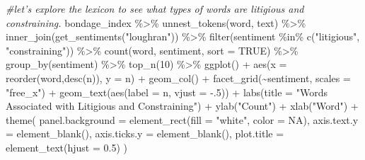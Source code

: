 \documentclass[
]{article}
\newenvironment{Shaded}{\begin{snugshade}}{\end{snugshade}}
\newcommand{\AttributeTok}[1]{\textcolor[rgb]{0.77,0.63,0.00}{#1}}
\newcommand{\CommentTok}[1]{\textcolor[rgb]{0.56,0.35,0.01}{\textit{#1}}}
\newcommand{\ConstantTok}[1]{\textcolor[rgb]{0.00,0.00,0.00}{#1}}
\newcommand{\DecValTok}[1]{\textcolor[rgb]{0.00,0.00,0.81}{#1}}
\newcommand{\FloatTok}[1]{\textcolor[rgb]{0.00,0.00,0.81}{#1}}
\newcommand{\FunctionTok}[1]{\textcolor[rgb]{0.00,0.00,0.00}{#1}}
\newcommand{\NormalTok}[1]{#1}
\newcommand{\SpecialCharTok}[1]{\textcolor[rgb]{0.00,0.00,0.00}{#1}}
\newcommand{\StringTok}[1]{\textcolor[rgb]{0.31,0.60,0.02}{#1}}
\begin{document}
\begin{Shaded}
\begin{Highlighting}[]
\CommentTok{\#let’s explore the lexicon to see what types of words are litigious and constraining.}
\NormalTok{bondage\_index }\SpecialCharTok{\%\textgreater{}\%} 
  \FunctionTok{unnest\_tokens}\NormalTok{(word, text) }\SpecialCharTok{\%\textgreater{}\%} 
  \FunctionTok{inner\_join}\NormalTok{(}\FunctionTok{get\_sentiments}\NormalTok{(}\StringTok{"loughran"}\NormalTok{)) }\SpecialCharTok{\%\textgreater{}\%}
  \FunctionTok{filter}\NormalTok{(sentiment }\SpecialCharTok{\%in\%} \FunctionTok{c}\NormalTok{(}\StringTok{"litigious"}\NormalTok{, }\StringTok{"constraining"}\NormalTok{)) }\SpecialCharTok{\%\textgreater{}\%}
  \FunctionTok{count}\NormalTok{(word, sentiment, }\AttributeTok{sort =} \ConstantTok{TRUE}\NormalTok{) }\SpecialCharTok{\%\textgreater{}\%}
  \FunctionTok{group\_by}\NormalTok{(sentiment) }\SpecialCharTok{\%\textgreater{}\%}
  \FunctionTok{top\_n}\NormalTok{(}\DecValTok{10}\NormalTok{) }\SpecialCharTok{\%\textgreater{}\%}
  \FunctionTok{ggplot}\NormalTok{() }\SpecialCharTok{+} 
  \FunctionTok{aes}\NormalTok{(}\AttributeTok{x =} \FunctionTok{reorder}\NormalTok{(word,}\FunctionTok{desc}\NormalTok{(n)), }\AttributeTok{y =}\NormalTok{ n) }\SpecialCharTok{+} 
  \FunctionTok{geom\_col}\NormalTok{() }\SpecialCharTok{+}
  \FunctionTok{facet\_grid}\NormalTok{(}\SpecialCharTok{\textasciitilde{}}\NormalTok{sentiment, }\AttributeTok{scales =} \StringTok{"free\_x"}\NormalTok{)  }\SpecialCharTok{+} 
  \FunctionTok{geom\_text}\NormalTok{(}\FunctionTok{aes}\NormalTok{(}\AttributeTok{label =}\NormalTok{ n, }\AttributeTok{vjust =} \SpecialCharTok{{-}}\NormalTok{.}\DecValTok{5}\NormalTok{)) }\SpecialCharTok{+} 
  \FunctionTok{labs}\NormalTok{(}\AttributeTok{title =} \StringTok{"Words Associated with Litigious and Constraining"}\NormalTok{) }\SpecialCharTok{+} 
  \FunctionTok{ylab}\NormalTok{(}\StringTok{"Count"}\NormalTok{) }\SpecialCharTok{+} 
  \FunctionTok{xlab}\NormalTok{(}\StringTok{"Word"}\NormalTok{) }\SpecialCharTok{+} 
  \FunctionTok{theme}\NormalTok{(}
    \AttributeTok{panel.background =} \FunctionTok{element\_rect}\NormalTok{(}\AttributeTok{fill =} \StringTok{"white"}\NormalTok{, }\AttributeTok{color =} \ConstantTok{NA}\NormalTok{),}
    \AttributeTok{axis.text.y =} \FunctionTok{element\_blank}\NormalTok{(), }
    \AttributeTok{axis.ticks.y =} \FunctionTok{element\_blank}\NormalTok{(),}
    \AttributeTok{plot.title =} \FunctionTok{element\_text}\NormalTok{(}\AttributeTok{hjust =} \FloatTok{0.5}\NormalTok{)}
\NormalTok{  )}
\end{Highlighting}
\end{Shaded}
\end{document}
